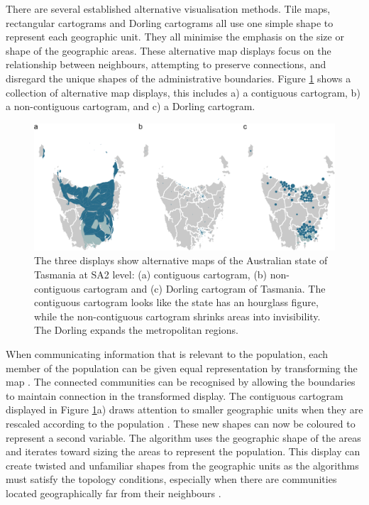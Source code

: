 There are several established alternative visualisation methods. Tile
maps, rectangular cartograms \citep{ORC} and Dorling cartograms
\citep{ACTUC} all use one simple shape to represent each geographic
unit. They all minimise the emphasis on the size or shape of the
geographic areas. These alternative map displays focus on the
relationship between neighbours, attempting to preserve connections, and
disregard the unique shapes of the administrative boundaries. Figure
\ref{fig:tas_displays} shows a collection of alternative map displays,
this includes a) a contiguous cartogram, b) a non-contiguous cartogram,
and c) a Dorling cartogram.

\begin{Schunk}
\begin{figure}
\includegraphics[width=0.95\linewidth]{kobakian-cook_files/figure-latex/tas_displays-1} \caption[The three displays show alternative maps of the Australian state of Tasmania at SA2 level]{The three displays show alternative maps of the Australian state of Tasmania at SA2 level: (a) contiguous cartogram, (b) non-contiguous cartogram and (c) Dorling cartogram of Tasmania. The contiguous cartogram looks like the state has an hourglass figure, while the non-contiguous cartogram shrinks areas into invisibility. The Dorling expands the metropolitan regions.}\label{fig:tas_displays}
\end{figure}
\end{Schunk}

When communicating information that is relevant to the population, each
member of the population can be given equal representation by
transforming the map \citep{TVSSS}. The connected communities can be
recognised by allowing the boundaries to maintain connection in the
transformed display. The contiguous cartogram displayed in Figure
\ref{fig:tas_displays}a) draws attention to smaller geographic units
when they are rescaled according to the population \citep{DMAHP}. These
new shapes can now be coloured to represent a second variable. The
algorithm uses the geographic shape of the areas and iterates toward
sizing the areas to represent the population. This display can create
twisted and unfamiliar shapes from the geographic units as the
algorithms must satisfy the topology conditions, especially when there
are communities located geographically far from their neighbours
\citep{TVSSS}.

